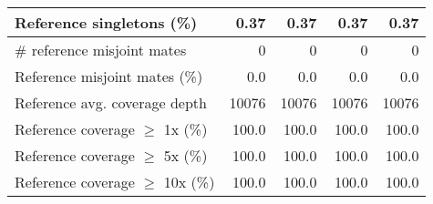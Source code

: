 \documentclass[12pt,a4paper]{article}
\begin{document}
\begin{table}[ht]
\begin{center}
\begin{tabular}{|l*{4}{|r}|}
Reference singletons (\%) & 0.37 & 0.37 & 0.37 & 0.37 \\ \hline
\# reference misjoint mates & 0 & 0 & 0 & 0 \\ \hline
Reference misjoint mates (\%) & 0.0 & 0.0 & 0.0 & 0.0 \\ \hline
Reference avg. coverage depth & 10076 & 10076 & 10076 & 10076 \\ \hline
Reference coverage $\geq$ 1x (\%) & 100.0 & 100.0 & 100.0 & 100.0 \\ \hline
Reference coverage $\geq$ 5x (\%) & 100.0 & 100.0 & 100.0 & 100.0 \\ \hline
Reference coverage $\geq$ 10x (\%) & 100.0 & 100.0 & 100.0 & 100.0 \\ \hline
\end{tabular}
\end{center}
\end{table}
\end{document}
